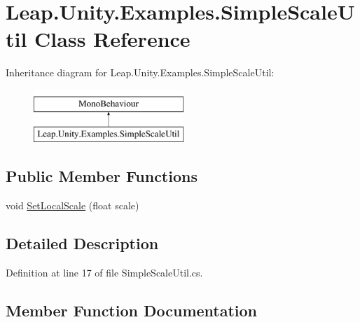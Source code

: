 \hypertarget{class_leap_1_1_unity_1_1_examples_1_1_simple_scale_util}{}\section{Leap.\+Unity.\+Examples.\+Simple\+Scale\+Util Class Reference}
\label{class_leap_1_1_unity_1_1_examples_1_1_simple_scale_util}
Inheritance diagram for Leap.\+Unity.\+Examples.\+Simple\+Scale\+Util\+:\begin{figure}[H]
\begin{center}
\leavevmode
\includegraphics[height=2.000000cm]{class_leap_1_1_unity_1_1_examples_1_1_simple_scale_util}
\end{center}
\end{figure}
\subsection*{Public Member Functions}
\begin{DoxyCompactItemize}
\item 
void \mbox{\hyperlink{class_leap_1_1_unity_1_1_examples_1_1_simple_scale_util_a6874eb6c04586d75eefa1b5faca88a97}{Set\+Local\+Scale}} (float scale)
\end{DoxyCompactItemize}


\subsection{Detailed Description}


Definition at line 17 of file Simple\+Scale\+Util.\+cs.



\subsection{Member Function Documentation}
\mbox{\label{class_leap_1_1_unity_1_1_examples_1_1_simple_scale_util_a6874eb6c04586d75eefa1b5faca88a97}} 
